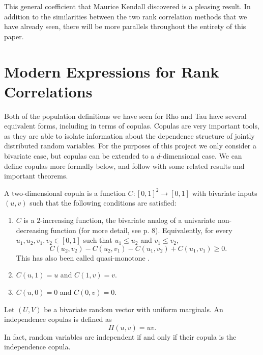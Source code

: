 This general coefficient that Maurice Kendall discovered is a pleasing result. In addition to the similarities between the two rank correlation methods that we have already seen, there will be more parallels throughout the entirety of this paper.
\section{Modern Expressions for Rank Correlations}\label{sec:modern_expressions}
\hspace{24pt} Both of the population definitions we have seen for Rho and Tau have several equivalent forms, including in terms of copulas. Copulas are very important tools, as they are able to isolate information about the dependence structure of jointly distributed random variables. For the purposes of this project we only consider a bivariate case, but copulas can be extended to a $d$-dimensional case. We can define copulas more formally below, and follow with some related results and important theorems.
\begin{definition}\label{def:copula}
    A two-dimensional copula is a function $C:[0,1]^2\to [0,1]$ with bivariate inputs $(u,v)$ such that the following conditions are satisfied:
    \begin{enumerate}
        \item $C$ is a $2$-increasing function, the bivariate analog of a univariate non-decreasing function (for more detail, see \cite{nelsen2006} p. 8). Equivalently, for every $u_1,u_2,v_1,v_2\in[0,1]$ such that $u_1\leq u_2$ and $v_1\leq v_2$, $$C\left(u_2,v_2\right)-C\left(u_2,v_1\right)-C\left(u_1,v_2\right)+C\left(u_1,v_1\right)\geq 0.$$ This has also been called quasi-monotone \cite{scarsini1984}.
        \item $C\left(u,1\right)=u$ and $C\left(1,v\right)=v$.
        \item $C\left(u,0\right)=0$ and $C\left(0,v\right)=0$.
    \end{enumerate}
\end{definition}
\begin{definition}\label{def:pi}
    Let $\left(U,V\right)$ be a bivariate random vector with uniform marginals. An independence copulas is defined as $$\Pi\left(u,v\right)=uv.$$ In fact, random variables are independent if and only if their copula is the independence copula.
\end{definition}
